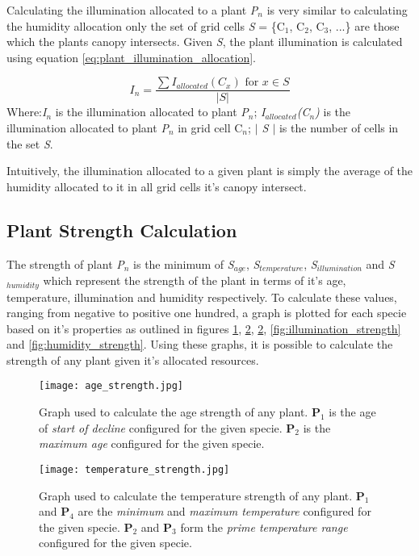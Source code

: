Calculating the illumination allocated to a plant \textit{P$_{n}$} is very similar to calculating the humidity allocation only the set of grid cells \textit{S} = \{C$_{1}$, C$_{2}$, C$_{3}$, ...\} are those which the plants canopy intersects. Given \textit{S}, the plant illumination is calculated using equation \ref{eq:plant_illumination_allocation}.

\begin{equation}
I_{n} = \frac{\sum I_{allocated}(C_{x}) \text{ for } x \in S}{| S |}
\label{eq:plant_illumination_allocation}
\end{equation}
Where:\textit{I$_{n}$} is the illumination allocated to plant \textit{P$_{n}$}; \textit{I$_{allocated}$(C$_{n}$)} is the illumination allocated to plant \textit{P$_{n}$} in grid cell C$_{n}$; \textit{$|$ S $|$ } is the number of cells in the set \textit{S}.

Intuitively, the illumination allocated to a given plant is simply the average of the humidity allocated to it in all grid cells it's canopy intersect.

\subsection{Plant Strength Calculation}

The strength of plant \textit{P$_{n}$} is the minimum of \textit{S$_{age}$}, \textit{S$_{temperature}$}, \textit{S$_{illumination}$} and \textit{S$_{humidity}$} which represent the strength of the plant in terms of it's age, temperature, illumination and humidity respectively. To calculate these values, ranging from negative to positive one hundred, a graph is plotted for each specie based on it's properties as outlined in figures \ref{fig:strength_calc_age}, \ref{fig:strength_calc_temp}, \ref{fig:strength_calc_temp}, \ref{fig:illumination_strength} and \ref{fig:humidity_strength}. Using these graphs, it is possible to calculate the strength of any plant given it's allocated resources.

\begin{figure}
\center
	\texttt{[image: age\_strength.jpg]}
	\caption{ Graph used to calculate the age strength of any plant. \textbf{P$_{1}$} is the age of \textit{start of decline} configured for the given specie. \textbf{P$_{2}$} is the \textit{maximum age} configured for the given specie. }	
	\label{fig:strength_calc_age}
\end{figure}

\begin{figure}
\center
	\texttt{[image: temperature\_strength.jpg]}
	\caption{ Graph used to calculate the temperature strength of any plant. \textbf{P$_{1}$} and \textbf{P$_{4}$} are the \textit{minimum} and \textit{maximum temperature} configured for the given specie. \textbf{P$_{2}$} and \textbf{P$_{3}$} form the \textit{prime temperature range} configured for the given specie.  }	
	\label{fig:strength_calc_temp}
\end{figure}

